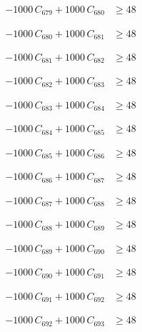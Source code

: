 \documentclass[a4paper,11pt]{article}
\begin{document}
\begin{align}
-1000\,C_{679} + 1000\,C_{680} &\geq 48 \nonumber
\end{align}

\begin{align}
-1000\,C_{680} + 1000\,C_{681} &\geq 48 \nonumber
\end{align}

\begin{align}
-1000\,C_{681} + 1000\,C_{682} &\geq 48 \nonumber
\end{align}

\begin{align}
-1000\,C_{682} + 1000\,C_{683} &\geq 48 \nonumber
\end{align}

\begin{align}
-1000\,C_{683} + 1000\,C_{684} &\geq 48 \nonumber
\end{align}

\begin{align}
-1000\,C_{684} + 1000\,C_{685} &\geq 48 \nonumber
\end{align}

\begin{align}
-1000\,C_{685} + 1000\,C_{686} &\geq 48 \nonumber
\end{align}

\begin{align}
-1000\,C_{686} + 1000\,C_{687} &\geq 48 \nonumber
\end{align}

\begin{align}
-1000\,C_{687} + 1000\,C_{688} &\geq 48 \nonumber
\end{align}

\begin{align}
-1000\,C_{688} + 1000\,C_{689} &\geq 48 \nonumber
\end{align}

\begin{align}
-1000\,C_{689} + 1000\,C_{690} &\geq 48 \nonumber
\end{align}

\begin{align}
-1000\,C_{690} + 1000\,C_{691} &\geq 48 \nonumber
\end{align}

\begin{align}
-1000\,C_{691} + 1000\,C_{692} &\geq 48 \nonumber
\end{align}

\begin{align}
-1000\,C_{692} + 1000\,C_{693} &\geq 48 \nonumber
\end{align}
\end{document}
